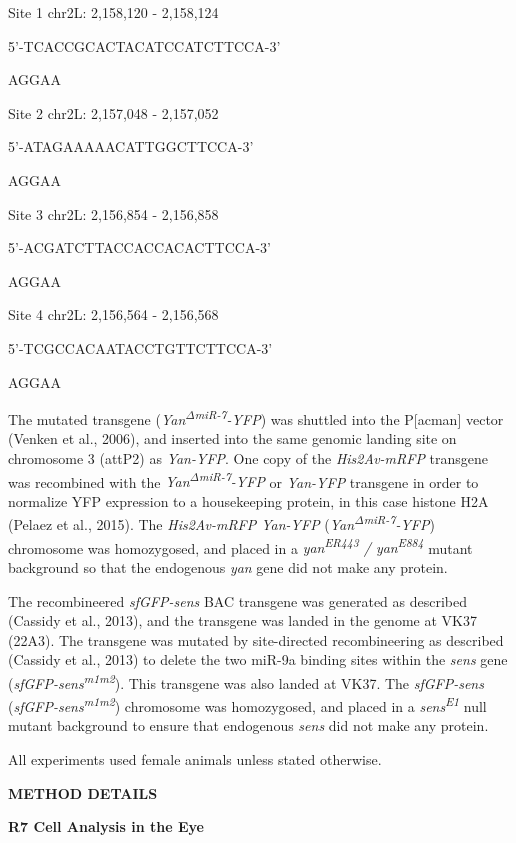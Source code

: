 Site 1 chr2L: 2,158,120 - 2,158,124

5'-TCACCGCACTACATCCATCTTCCA-3'

AGGAA

Site 2 chr2L: 2,157,048 - 2,157,052

5'-ATAGAAAAACATTGGCTTCCA-3'

AGGAA

Site 3 chr2L: 2,156,854 - 2,156,858

5'-ACGATCTTACCACCACACTTCCA-3'

AGGAA

Site 4 chr2L: 2,156,564 - 2,156,568

5'-TCGCCACAATACCTGTTCTTCCA-3'

AGGAA

The mutated transgene (\emph{Yan\textsuperscript{ΔmiR-7}-YFP}) was shuttled into the P{[}acman{]} vector (Venken et al., 2006), and inserted into the same genomic landing site on chromosome 3 (attP2) as \emph{Yan-YFP}. One copy of the \emph{His2Av-mRFP} transgene was recombined with the \emph{Yan\textsuperscript{ΔmiR-7}-YFP} or \emph{Yan-YFP} transgene in order to normalize YFP expression to a housekeeping protein, in this case histone H2A (Pelaez et al., 2015). The \emph{His2Av-mRFP Yan-YFP} (\emph{Yan\textsuperscript{ΔmiR-7}-YFP}) chromosome was homozygosed, and placed in a \emph{yan\textsuperscript{ER443} / yan\textsuperscript{E884}} mutant background so that the endogenous \emph{yan} gene did not make any protein.

The recombineered \emph{sfGFP-sens} BAC transgene was generated as described (Cassidy et al., 2013), and the transgene was landed in the genome at VK37 (22A3). The transgene was mutated by site-directed recombineering as described (Cassidy et al., 2013) to delete the two miR-9a binding sites within the \emph{sens} gene (\emph{sfGFP-sens\textsuperscript{m1m2}}). This transgene was also landed at VK37. The \emph{sfGFP-sens} (\emph{sfGFP-sens\textsuperscript{m1m2}}) chromosome was homozygosed, and placed in a \emph{sens\textsuperscript{E1}} null mutant background to ensure that endogenous \emph{sens} did not make any protein.

All experiments used female animals unless stated otherwise.

\textbf{METHOD DETAILS }

\textbf{R7 Cell Analysis in the Eye}

